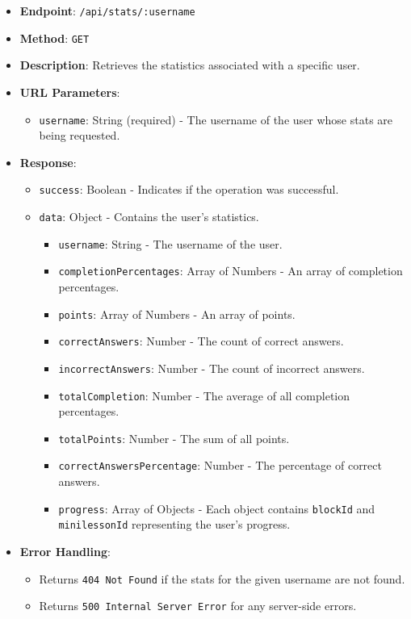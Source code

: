 \begin{itemize}
\tightlist
\item
  \textbf{Endpoint}: \texttt{/api/stats/:username}
\item
  \textbf{Method}: \texttt{GET}
\item
  \textbf{Description}: Retrieves the statistics associated with a
  specific user.
\item
  \textbf{URL Parameters}:

  \begin{itemize}
  \tightlist
  \item
    \texttt{username}: String (required) - The username of the user
    whose stats are being requested.
  \end{itemize}
\item
  \textbf{Response}:

  \begin{itemize}
  \tightlist
  \item
    \texttt{success}: Boolean - Indicates if the operation was
    successful.
  \item
    \texttt{data}: Object - Contains the user's statistics.

    \begin{itemize}
    \tightlist
    \item
      \texttt{username}: String - The username of the user.
    \item
      \texttt{completionPercentages}: Array of Numbers - An array of
      completion percentages.
    \item
      \texttt{points}: Array of Numbers - An array of points.
    \item
      \texttt{correctAnswers}: Number - The count of correct answers.
    \item
      \texttt{incorrectAnswers}: Number - The count of incorrect
      answers.
    \item
      \texttt{totalCompletion}: Number - The average of all completion
      percentages.
    \item
      \texttt{totalPoints}: Number - The sum of all points.
    \item
      \texttt{correctAnswersPercentage}: Number - The percentage of
      correct answers.
    \item
      \texttt{progress}: Array of Objects - Each object contains
      \texttt{blockId} and \texttt{minilessonId} representing the user's
      progress.
    \end{itemize}
  \end{itemize}
\item
  \textbf{Error Handling}:

  \begin{itemize}
  \tightlist
  \item
    Returns \texttt{404\ Not\ Found} if the stats for the given username
    are not found.
  \item
    Returns \texttt{500\ Internal\ Server\ Error} for any server-side
    errors.
  \end{itemize}
\end{itemize}

